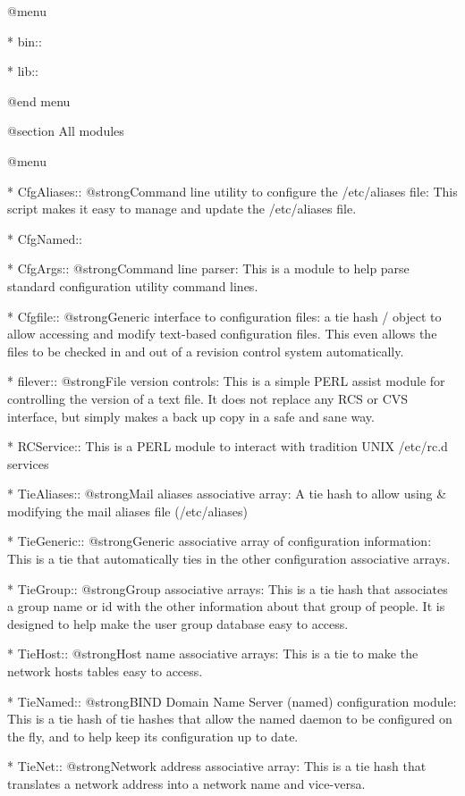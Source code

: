 @menu

* bin::	



* lib::	



@end menu

@section All modules

@menu

* CfgAliases::	@strong{Command line utility to configure the /etc/aliases file:}  This script makes it easy to manage and update the /etc/aliases file. 

* CfgNamed::	

* CfgArgs::	@strong{Command line parser:} This is a module to help parse standard configuration utility command lines. 

* Cfgfile::	@strong{Generic interface to configuration files:} a tie hash / object to allow accessing and modify text-based configuration files.  This even allows the files to be checked in and out of a revision control system automatically. 

* filever::	@strong{File version controls:} This is a simple PERL assist module for controlling the version of a text file.  It does not replace any RCS or CVS interface, but simply makes a back up copy in a safe and sane way. 

* RCService::	This is a PERL module to interact with tradition UNIX /etc/rc.d services 

* TieAliases::	@strong{Mail aliases associative array:} A tie hash to allow using & modifying the mail aliases file (/etc/aliases) 

* TieGeneric::	@strong{Generic associative array of configuration information:}  This is a tie that automatically ties in the other configuration associative arrays. 

* TieGroup::	@strong{Group associative arrays:} This is a tie hash that associates a group name or id with the other information about that group of people.  It is designed to help make the user group database easy to access. 

* TieHost::	@strong{Host name associative arrays:} This is a tie to make the network hosts tables easy to access. 

* TieNamed::	@strong{BIND Domain Name Server (named) configuration module:} This is a tie hash of tie hashes that allow the named daemon to be configured on the fly, and to help keep its configuration up to date. 

* TieNet::	@strong{Network address associative array:} This is a tie hash that translates a network address into a network name and vice-versa. 

